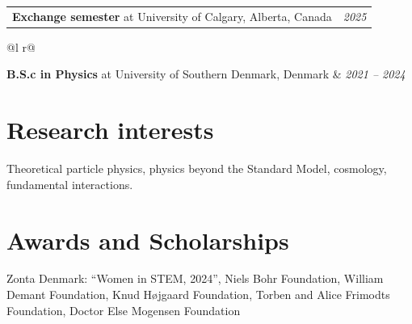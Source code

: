\documentclass[a4paper, 11pt]{article}
\begin{document}
\vspace{0.1cm}

\begin{tabularx}{\linewidth}{@{}X r@{}}	
\textbf{Exchange semester} at University of Calgary, Alberta, Canada& \hfill \textit{2025} 
\end{tabularx}

\vspace{0.1cm}

\begin{tabularx}{\linewidth}{@{}l r@{}}	

 \textbf{B.S.c in Physics} at University of Southern Denmark, Denmark  & \hfill \textit{2021 -- 2024} \\ [3.75pt]
\end{tabularx}


\section{Research interests}
Theoretical particle physics, physics beyond the Standard Model, cosmology, fundamental interactions.


\vspace{0.1cm}

\section{Awards and Scholarships}
Zonta Denmark: \enquote{Women in STEM, 2024}, Niels Bohr Foundation, William Demant Foundation, Knud Højgaard Foundation, Torben and Alice Frimodts Foundation, Doctor Else Mogensen Foundation

\vspace{0.1cm}
\end{document}
